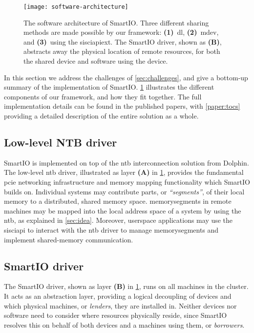 \begin{figure}
    \centering
    \texttt{[image: software-architecture]}
    \caption[Three different sharing methods are made possible by our framework. The SmartIO driver abstracts away the physical location of a remote resource]
    {The software architecture of SmartIO. Three different sharing methods are made possible by our framework: \textbf{(1)}~\gls{dl}, \textbf{(2)}~\gls{mdev}, and \textbf{(3)}~using the \gls{sisciapiext}. The SmartIO driver, shown as \textbf{(B)}, abstracts away the physical location of remote resources, for both the shared device and software using the device.}
    \label{fig:architecture}
\end{figure}


In this section we address the challenges of \cref{sec:challenges}, and give a bottom-up summary of the implementation of SmartIO.
%
\cref{fig:architecture} illustrates the different components of our framework, and how they fit together.
%
The full implementation details can be found in the published papers, with \cref{paper:tocs} providing a detailed description of the entire solution as a whole.



\subsection{Low-level NTB driver}\label{sec:ntb-driver}
SmartIO is implemented on top of the \gls{ntb} interconnection solution from Dolphin.
%
The low-level \gls{ntb} driver, illustrated as layer \textbf{(A)} in \cref{fig:architecture}, provides the fundamental \gls{pcie} networking infrastructure and memory mapping functionality which SmartIO builds on.
%
Individual systems may contribute parts, or \emph{``\glspl{segment}''}, of their local memory to a distributed, shared memory space. 
%
\Glspl{memorysegment} in remote machines may be mapped into the local address space of a system by using the \gls{ntb}, as explained in \cref{sec:idea}.
%
Moreover, \gls{userspace} applications may use the \gls{sisciapi} to interact with the \gls{ntb} driver to manage \glspl{memorysegment} and implement shared-memory communication.



\subsection{SmartIO driver}\label{sec:smartio-driver}
The SmartIO driver, shown as layer \textbf{(B)} in \cref{fig:architecture}, runs on all machines in the cluster.
%
It acts as an abstraction layer, providing a logical decoupling of devices and which physical machines, or \emph{\glspl{lender}}, they are installed in.
%
Neither devices nor software need to consider where resources physically reside, since SmartIO resolves this on behalf of both devices and a machines using them, or \emph{\glspl{borrower}}.


